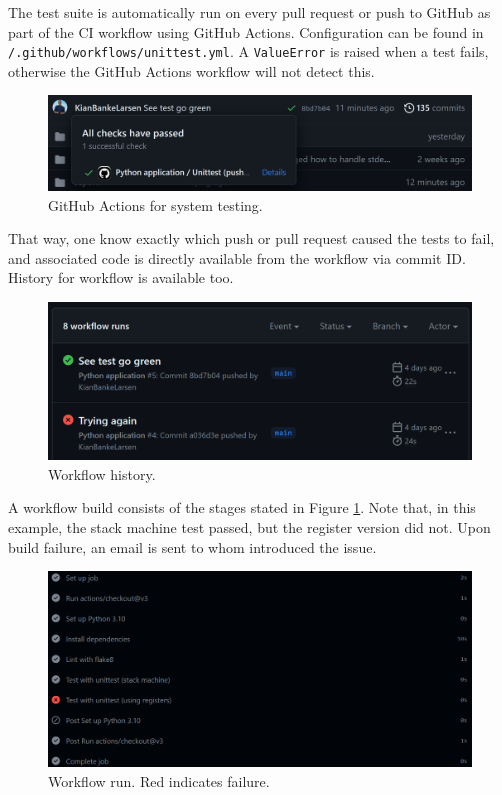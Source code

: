 The test suite is automatically run on every pull request or push to GitHub as part of the CI workflow using GitHub Actions. Configuration can be found in \texttt{/.github/workflows/unittest.yml}. A \texttt{ValueError} is raised when a test fails, otherwise the GitHub Actions workflow will not detect this.

\begin{figure}[H]
    \centering
    \includegraphics[width=1\textwidth]{misc/images/GitHub_Actions.png}
    \caption{GitHub Actions for system testing.}
\end{figure}

That way, one know exactly which push or pull request caused the tests to fail, and associated code is directly available from the workflow via commit ID. History for workflow is available too.

\begin{figure}[H]
    \centering
    \includegraphics[width=1\textwidth]{misc/images/Workflow.png}
    \caption{Workflow history.}
\end{figure}

A workflow build consists of the stages stated in Figure \ref{fig:workflow_run}.  Note that, in this example, the stack machine test passed, but the register version did not. Upon build failure, an email is sent to whom introduced the issue.

\begin{figure}[H]
    \centering
    \includegraphics[width=1\textwidth]{misc/images/workflow_run.png}
    \caption{Workflow run. Red indicates failure.}
    \label{fig:workflow_run}
\end{figure}

